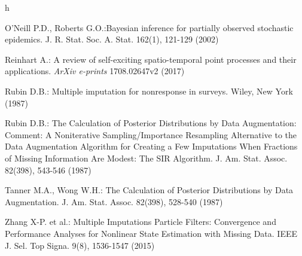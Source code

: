 h\documentclass[11pt,a4paper]{article}
\begin{document}
\begin{thebibliography}{99}
O'Neill P.D., Roberts G.O.:Bayesian inference for partially observed stochastic epidemics. J. R. Stat. Soc. A. Stat. 162(1), 121-129 (2002)

 Reinhart A.: A review of self-exciting spatio-temporal point processes and their applications. \textit{ArXiv e-prints} 1708.02647v2 (2017) 

Rubin D.B.: Multiple imputation for nonresponse in surveys. Wiley, New York (1987)

Rubin D.B.: The Calculation of Posterior Distributions by Data Augmentation: Comment: A Noniterative Sampling/Importance Resampling Alternative to the Data Augmentation Algorithm for Creating a Few Imputations When Fractions of Missing Information Are Modest: The SIR Algorithm. J. Am. Stat. Assoc. 82(398), 543-546 (1987)

Tanner M.A., Wong W.H.: The Calculation of Posterior Distributions by Data Augmentation. J. Am. Stat. Assoc. 82(398), 528-540 (1987)

Zhang X-P. et al.: Multiple Imputations Particle Filters: Convergence and Performance Analyses for Nonlinear State Estimation with Missing Data. IEEE J. Sel. Top Signa. 9(8), 1536-1547 (2015)



\end{thebibliography}
\end{document}
